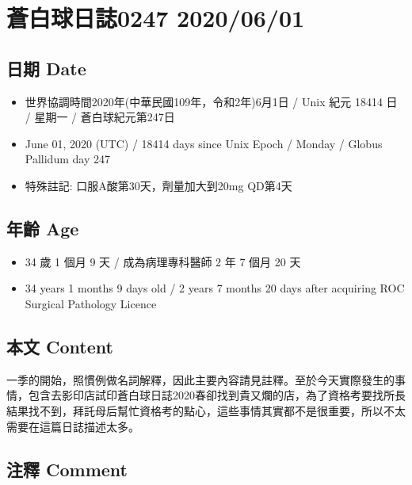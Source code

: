 \documentclass[
]{article}
\author{}
\date{}
\providecommand{\tightlist}{%
  \setlength{\itemsep}{0pt}\setlength{\parskip}{0pt}}
\begin{document}
\hypertarget{ux84bcux767dux7403ux65e5ux8a8c0247-20200601}{%
\section{蒼白球日誌0247
2020/06/01}\label{ux84bcux767dux7403ux65e5ux8a8c0247-20200601}}

\hypertarget{ux65e5ux671f-date}{%
\subsection{日期 Date}\label{ux65e5ux671f-date}}

\begin{itemize}
\tightlist
\item
  世界協調時間2020年(中華民國109年，令和2年)6月1日 / Unix 紀元 18414 日
  / 星期一 / 蒼白球紀元第247日
\item
  June 01, 2020 (UTC) / 18414 days since Unix Epoch / Monday / Globus
  Pallidum day 247
\item
  特殊註記: 口服A酸第30天，劑量加大到20mg QD第4天
\end{itemize}

\hypertarget{ux5e74ux9f61-age}{%
\subsection{年齡 Age}\label{ux5e74ux9f61-age}}

\begin{itemize}
\tightlist
\item
  34 歲 1 個月 9 天 / 成為病理專科醫師 2 年 7 個月 20 天
\item
  34 years 1 months 9 days old / 2 years 7 months 20 days after
  acquiring ROC Surgical Pathology Licence
\end{itemize}

\hypertarget{ux672cux6587-content}{%
\subsection{本文 Content}\label{ux672cux6587-content}}

一季的開始，照慣例做名詞解釋，因此主要內容請見註釋。至於今天實際發生的事情，包含去影印店試印蒼白球日誌2020春卻找到貴又爛的店，為了資格考要找所長結果找不到，拜託母后幫忙資格考的點心，這些事情其實都不是很重要，所以不太需要在這篇日誌描述太多。

\hypertarget{ux6ce8ux91cb-comment}{%
\subsection{注釋 Comment}\label{ux6ce8ux91cb-comment}}
\end{document}
